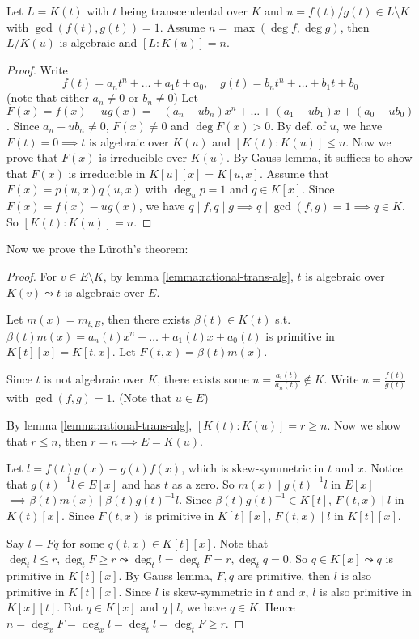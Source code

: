 \begin{lemma} \label{lemma:rational-trans-alg}
  Let $L = K(t)$ with $t$ being transcendental over $K$ and $u = f(t) / g(t) \in L \setminus K$
  with $\gcd(f(t), g(t)) = 1$.
  Assume $n = \max(\deg f, \deg g)$, then $L/K(u)$ is algebraic and $[L: K(u)] = n$.
  \begin{proof}
    Write
    \[ f(t) = a_n t^n + \dots + a_1 t + a_0, \quad g(t) = b_n t^n + \dots + b_1 t + b_0 \]
    (note that either $a_n \ne 0$ or $b_n \ne 0$)
    Let $F(x) = f(x) - ug(x) =-(a_n - ub_n) x^n + \dots + (a_1 - ub_1)x + (a_0 - ub_0)$.
    Since $a_n - ub_n \ne 0$, $F(x) \ne 0$ and $\deg F(x) > 0$.
    By def. of $u$, we have $F(t) = 0 \implies t$ is algebraic over $K(u)$ and
    $[K(t):K(u)] \le n$.
    Now we prove that $F(x)$ is irreducible over $K(u)$.
    By Gauss lemma, it suffices to show that $F(x)$ is irreducible in
    $K[u][x] = K[u, x]$.
    Assume that $F(x) = p(u, x) q(u, x)$ with $\deg_u p = 1$ and $q \in K[x]$.
    Since $F(x) = f(x) - ug(x)$, we have
    $q \mid f, q\mid g \implies q \mid \gcd(f, g) = 1 \implies q \in K$.
    So $[K(t):K(u)] = n$.
  \end{proof}
\end{lemma}

Now we prove the L\"{u}roth's theorem:
\begin{proof}
  For $v \in E \setminus K$, by lemma \ref{lemma:rational-trans-alg},
  $t$ is algebraic over $K(v) \leadsto t$ is algebraic over $E$.

  Let $m(x) = m_{t,E}$, then there exists $\beta(t) \in K(t)$ s.t.
  $\beta(t)m(x) = a_n(t)x^n + \dots + a_1(t)x + a_0(t)$ is primitive
  in $K[t][x] = K[t, x]$. Let $F(t, x) = \beta(t)m(x)$.

  Since $t$ is not algebraic over $K$, there exists some $u = \frac{a_i(t)}{a_n(t)} \not\in K$.
  Write $u = \frac{f(t)}{g(t)}$ with $\gcd(f, g) = 1$.
  (Note that $u \in E$)

  By lemma \ref{lemma:rational-trans-alg}, $[K(t): K(u)] = r \ge n$.
  Now we show that $r \le n$, then $r = n \implies E = K(u)$.

  Let $l = f(t)g(x) - g(t)f(x)$, which is skew-symmetric in $t$ and $x$.
  Notice that $g(t)^{-1} l \in E[x]$ and has $t$ as a zero.
  So $m(x) \mid g(t)^{-1} l$ in $E[x]$ $\implies \beta(t)m(x) \mid \beta(t)g(t)^{-1} l$.
  Since $\beta(t)g(t)^{-1} \in K[t]$, $F(t, x) \mid l$ in $K(t)[x]$.
  Since $F(t, x)$ is primitive in $K[t][x]$, $F(t, x) \mid l$ in $K[t][x]$.

  Say $l = Fq$ for some $q(t,x) \in K[t][x]$.
  Note that $\deg_t l \le r, \deg_t F \ge r \leadsto \deg_t l =\deg_t F = r,
  \deg_t q = 0$. So $q \in K[x] \leadsto q$ is primitive in $K[t][x]$.
  By Gauss lemma, $F, q$ are primitive, then $l$ is also primitive in $K[t][x]$.
  Since $l$ is skew-symmetric in $t$ and $x$, $l$ is also primitive in $K[x][t]$.
  But $q\in K[x]$ and $q \mid l$, we have $q \in K$.
  Hence $n = \deg_x F = \deg_x l = \deg_t l  = \deg_t F \ge r$.
\end{proof}

